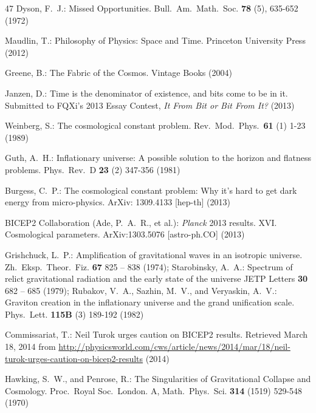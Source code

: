 \documentclass[11pt]{article}
\begin{document}
\begin{thebibliography}{47}
 Dyson, F.~J.: Missed Opportunities. Bull.\ Am.\ Math.\ Soc. \textbf{78} (5), 635-652 (1972)

 Maudlin, T.: Philosophy of Physics: Space and Time. Princeton University Press (2012) 

 Greene, B.: The Fabric of the Cosmos. Vintage Books (2004)

 Janzen, D.: Time is the denominator of existence, and bits come to be in it. Submitted to FQXi's 2013 Essay Contest, \textit{It From Bit or Bit From It?} (2013)

 Weinberg, S.: The cosmological constant problem. Rev.\ Mod.\ Phys.\ \textbf{61} (1) 1-23 (1989)

 Guth, A.~H.: Inflationary universe: A possible solution to the horizon and flatness problems. Phys.\ Rev.\ D \textbf{23} (2) 347-356 (1981)

 Burgess, C.~P.: The cosmological constant problem: Why it's hard to get dark energy from micro-physics. ArXiv: 1309.4133 [hep-th] (2013)

 BICEP2 Collaboration (Ade, P.~A.~R., et al.): \textit{Planck} 2013 results. XVI. Cosmological parameters. ArXiv:1303.5076 [astro-ph.CO] (2013)

 Grishchuck, L.~P.: Amplification of gravitational waves in an isotropic universe. Zh.\ Eksp.\ Theor.\ Fiz. \textbf{67} 825 -- 838 (1974); Starobinsky, A.~A.: Spectrum of relict gravitational radiation and the early state of the universe JETP Letters \textbf{30} 682 -- 685 (1979); Rubakov, V.~A., Sazhin, M.~V., and Veryaskin, A.~V.: Graviton creation in the inflationary universe and the grand unification scale. Phys.\ Lett. \textbf{115B} (3) 189-192 (1982)

 Commissariat, T.: Neil Turok urges caution on BICEP2 results. Retrieved March 18, 2014 from \url{http://physicsworld.com/cws/article/news/2014/mar/18/neil-turok-urges-caution-on-bicep2-results} (2014)

 Hawking, S.~W., and Penrose, R.: The Singularities of Gravitational Collapse and Cosmology. Proc.\ Royal Soc.\ London. A, Math.\ Phys.\ Sci. \textbf{314} (1519) 529-548 (1970)


\end{thebibliography}
\end{document}
